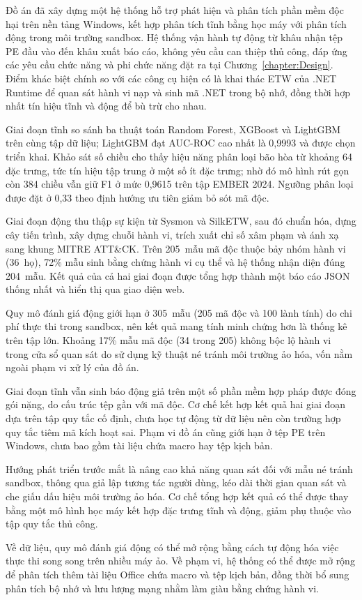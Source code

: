 \documentclass[../DoAn.tex]{subfiles}
\begin{document}
Đồ án đã xây dựng một hệ thống hỗ trợ phát hiện và phân tích phần mềm
độc hại trên nền tảng Windows, kết hợp phân tích tĩnh bằng học máy với
phân tích động trong môi trường sandbox. Hệ thống vận hành tự động từ
khâu nhận tệp PE đầu vào đến khâu xuất báo cáo, không yêu cầu can thiệp
thủ công, đáp ứng các yêu cầu chức năng và phi chức năng đặt ra tại
Chương~\ref{chapter:Design}. Điểm khác biệt chính so với các công cụ
hiện có là khai thác ETW của .NET Runtime để quan sát hành vi nạp và
sinh mã .NET trong bộ nhớ, đồng thời hợp nhất tín hiệu tĩnh và động để
bù trừ cho nhau.

Giai đoạn tĩnh so sánh ba thuật toán Random Forest, XGBoost và LightGBM
trên cùng tập dữ liệu; LightGBM đạt AUC-ROC cao nhất là 0{,}9993 và
được chọn triển khai. Khảo sát số chiều cho thấy hiệu năng phân loại
bão hòa từ khoảng 64 đặc trưng, tức tín hiệu tập trung ở một số ít đặc
trưng; nhờ đó mô hình rút gọn còn 384 chiều vẫn giữ F1 ở mức 0{,}9615
trên tập EMBER 2024. Ngưỡng phân loại được đặt ở 0{,}33 theo định hướng
ưu tiên giảm bỏ sót mã độc.

Giai đoạn động thu thập sự kiện từ Sysmon và SilkETW, sau đó chuẩn hóa,
dựng cây tiến trình, xây dựng chuỗi hành vi, trích xuất chỉ số xâm phạm
và ánh xạ sang khung MITRE ATT\&CK. Trên 205~mẫu mã độc thuộc bảy nhóm
hành vi (36~họ), 72\% mẫu sinh bằng chứng hành vi cụ thể và hệ thống nhận
diện đúng 204~mẫu. Kết quả của cả hai giai đoạn được tổng hợp thành một
báo cáo JSON thống nhất và hiển thị qua giao diện web.

Quy mô đánh giá động giới hạn ở 305~mẫu (205 mã độc và 100 lành tính)
do chi phí thực thi trong sandbox, nên kết quả mang tính minh chứng hơn
là thống kê trên tập lớn.
Khoảng 17\% mẫu mã độc (34 trong 205) không bộc lộ hành vi trong cửa sổ
quan sát do sử
dụng kỹ thuật né tránh môi trường ảo hóa, vốn nằm ngoài phạm vi xử lý
của đồ án.

Giai đoạn tĩnh vẫn sinh báo động giả trên một số phần mềm hợp pháp được
đóng gói nặng, do cấu trúc tệp gần với mã độc. Cơ chế kết hợp kết quả
hai giai đoạn dựa trên tập quy tắc cố định, chưa học tự động từ dữ liệu
nên còn trường hợp quy tắc tiêm mã kích hoạt sai. Phạm vi đồ án cũng
giới hạn ở tệp PE trên Windows, chưa bao gồm tài liệu chứa macro hay
tệp kịch bản.

Hướng phát triển trước mắt là nâng cao khả năng quan sát đối với mẫu né
tránh sandbox, thông qua giả lập tương tác người dùng, kéo dài thời
gian quan sát và che giấu dấu hiệu môi trường ảo hóa. Cơ chế tổng hợp
kết quả có thể được thay bằng một mô hình học máy kết hợp đặc trưng
tĩnh và động, giảm phụ thuộc vào tập quy tắc thủ công.

Về dữ liệu, quy mô đánh giá động có thể mở rộng bằng cách tự động hóa
việc thực thi song song trên nhiều máy ảo. Về phạm vi, hệ thống có thể
được mở rộng để phân tích thêm tài liệu Office chứa macro và tệp kịch
bản, đồng thời bổ sung phân tích bộ nhớ và lưu lượng mạng nhằm làm giàu
bằng chứng hành vi.
\end{document}
